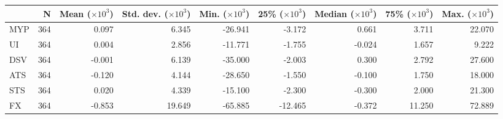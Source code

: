 \begin{tabular}{lrrrrrrrr} 
 \hline 
 \hline
 & N & Mean ($\times 10^3$) & Std. dev. ($\times 10^3$) & Min. ($\times 10^3$) & 25\% ($\times 10^3$) & Median ($\times 10^3$) & 75\% ($\times 10^3$) & Max. ($\times 10^3$) \\
\hline 
 MYP & 364 & 0.097 & 6.345 & -26.941 & -3.172 & 0.661 & 3.711 & 22.070 \\
UI & 364 & 0.004 & 2.856 & -11.771 & -1.755 & -0.024 & 1.657 & 9.222 \\
DSV & 364 & -0.001 & 6.139 & -35.000 & -2.003 & 0.300 & 2.792 & 27.600 \\
ATS & 364 & -0.120 & 4.144 & -28.650 & -1.550 & -0.100 & 1.750 & 18.000 \\
STS & 364 & 0.020 & 4.339 & -15.100 & -2.300 & -0.300 & 2.000 & 21.300 \\
FX & 364 & -0.853 & 19.649 & -65.885 & -12.465 & -0.372 & 11.250 & 72.889 \\

 \hline \hline 
 \end{tabular}
